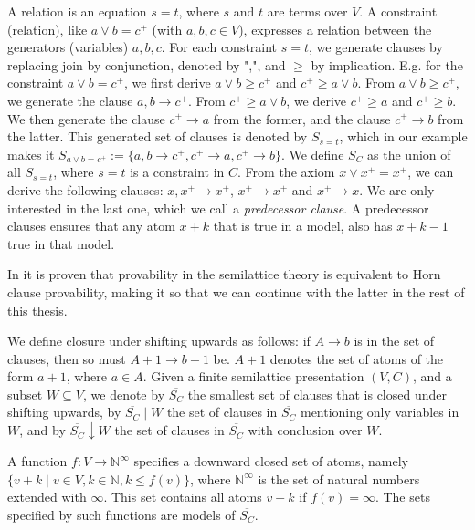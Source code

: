 A relation is an equation $s = t$, where $s$ and $t$ are terms over $V$.
A constraint (relation), like $a \lor b = c^+$ (with $a, b, c \in V$), expresses a relation between the generators (variables) $a, b, c$.
For each constraint $s = t$, we generate clauses by replacing join by conjunction, denoted by ",", and $\geq$ by implication.
E.g. for the constraint $a \lor b = c^+$, we first derive $a \lor b \geq c^+$ and $c^+ \geq a \lor b$.
From $a \lor b \geq c^+$, we generate the clause $a, b \rightarrow c^+$.
From $c^+ \geq a \lor b$, we derive $c^+ \geq a$ and $c^+ \geq b$.
We then generate the clause $c^+ \rightarrow a$ from the former, and the clause $c^+ \rightarrow b$ from the latter.
This generated set of clauses is denoted by $S_{s=t}$, which in our example makes it
$S_{a \lor b = c^+} := \{a, b \rightarrow c^+, c^+ \rightarrow a, c^+ \rightarrow b\}$.
We define $S_C$ as the union of all $S_{s=t}$, where $s = t$ is a constraint in $C$.
From the axiom $x \lor x^+ = x^+$, we can derive the following clauses:
$x, x^+ \rightarrow x^+$,
$x^+ \rightarrow x^+$ and $x^+ \rightarrow x$.
We are only interested in the last one, which we call a \textit{predecessor clause}.
A predecessor clauses ensures that any atom $x + k$ that is true in a model,
also has $x + k - 1$ true in that model.


In \cite[Theorem 2.2,~p.~3]{mbezem} it is proven that provability in the semilattice theory
is equivalent to Horn clause provability, making it so that we can continue with the latter in the rest of this thesis.

We define closure under shifting upwards as follows:
if $A \rightarrow b$ is in the set of clauses, then so must $A + 1 \rightarrow b + 1$ be.
$A + 1$ denotes the set of atoms of the form $a + 1$, where $a \in A$.
Given a finite semilattice presentation $(V, C)$,
and a subset $W \subseteq V$, we denote by
$\overline{S_C}$ the smallest set of clauses that is closed under shifting upwards,
by $\overline{S_C} \mid W$ the set of clauses in $\overline{S_C}$
mentioning only variables in $W$, and by $\overline{S_C} \downarrow W$
the set of clauses in $\overline{S_C}$ with conclusion over $W$.

A function $f : V \rightarrow \mathbb{N}^{\infty}$ specifies a downward closed set of atoms,
namely $\{v + k \mid v \in V, k \in \mathbb{N}, k \le f(v)\}$,
where $\mathbb{N}^{\infty}$ is the set of natural numbers extended with $\infty$.
This set contains all atoms $v + k$ if $f(v) = \infty$.
The sets specified by such functions are models of $\overline{S_C}$.

